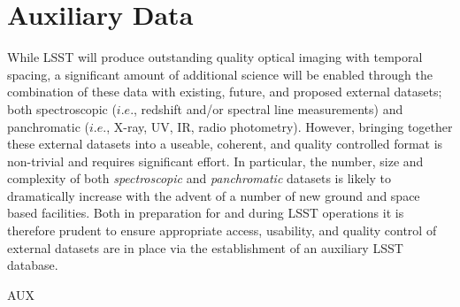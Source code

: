 \section{Auxiliary Data}\label{sec:tasks:aux}  
{\justify
While LSST will produce outstanding quality optical imaging with temporal spacing, a significant amount of additional science will be enabled through the combination of these data with existing, future, and proposed external datasets; both spectroscopic ($i.e.$, redshift and/or spectral line measurements) and panchromatic ($i.e.$, X-ray, UV, IR, radio photometry). However, bringing together these external datasets into a useable, coherent, and quality controlled format is non-trivial and requires significant effort. In particular, the number, size and complexity of both {\it spectroscopic} and {\it panchromatic} datasets is likely to dramatically increase with the advent of a number of new ground and space based facilities. Both in preparation for and during LSST operations it is therefore prudent to ensure appropriate access, usability, and quality control of external datasets are in place via the establishment of an auxiliary LSST database.



\begin{tasklist}{AUX}

\end{tasklist}}
